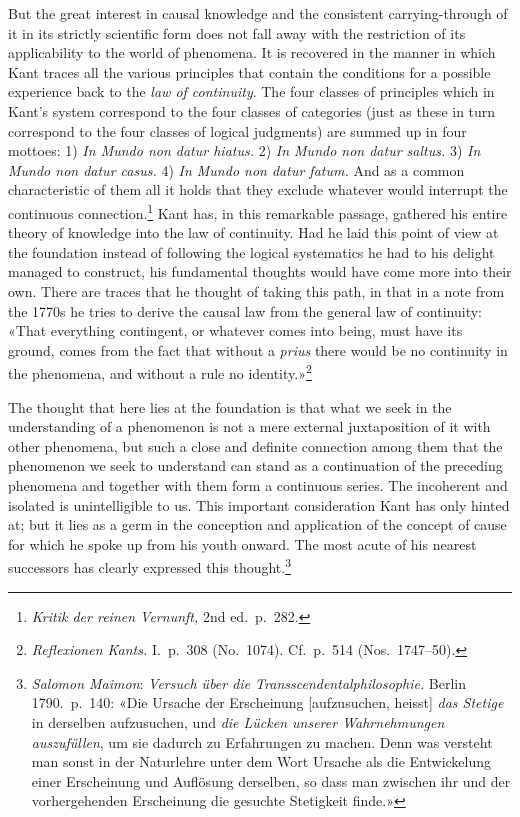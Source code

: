 \documentclass[12pt,a4paper]{article}
\begin{document}
But the great interest in causal knowledge and the consistent
carrying-through of it in its strictly scientific form does not fall away
with the restriction of its applicability to the world of phenomena. It is
recovered in the manner in which Kant traces all the various principles
that contain the conditions for a possible experience back to the \emph{law of
continuity}. The four classes of principles which in Kant's system
correspond to the four classes of categories (just as these in turn
correspond to the four classes of logical judgments) are summed up in four
mottoes: 1) \textit{In Mundo non datur hiatus.} 2) \textit{In Mundo non
datur saltus.} 3) \textit{In Mundo non datur casus.} 4) \textit{In Mundo
non datur fatum.} And as a common characteristic of them all it holds that
they exclude whatever would interrupt the continuous
connection.\footnote{\textit{Kritik der reinen Vernunft,} 2nd ed.\ p.\
282.} Kant has, in this remarkable passage, gathered his entire theory of
knowledge into the law of continuity. Had he laid this point of view at
the foundation instead of following the logical systematics he had to his
delight managed to construct, his fundamental thoughts would have come
more into their own. There are traces that he thought of taking this path,
in that in a note from the 1770s he tries to derive the causal law from
the general law of continuity: «That everything contingent, or whatever
comes into being, must have its ground, comes from the fact that without a
\textit{prius} there would be no continuity in the phenomena, and without a
rule no identity.»\footnote{\textit{Reflexionen Kants.} I.\ p.\ 308 (No.\
1074). Cf.\ p.\ 514 (Nos.\ 1747--50).}

The thought that here lies at the foundation is that what we seek in the
understanding of a phenomenon is not a mere external juxtaposition of it
with other phenomena, but such a close and definite connection among them
that the phenomenon we seek to understand can stand as a continuation of
the preceding phenomena and together with them form a continuous series.
The incoherent and isolated is unintelligible to us. This important
consideration Kant has only hinted at; but it lies as a germ in the
conception and application of the concept of cause for which he spoke up
from his youth onward. The most acute of his nearest successors has
clearly expressed this thought.\footnote{\emph{Salomon Maimon}: \textit{Versuch
über die Transscendentalphilosophie.} Berlin 1790.\ p.\ 140: «Die Ursache
der Erscheinung [aufzusuchen, heisst] \emph{das Stetige} in derselben
aufzusuchen, und \emph{die Lücken unserer Wahrnehmungen auszufüllen}, um sie
dadurch zu Erfahrungen zu machen. Denn was versteht man sonst in der
Naturlehre unter dem Wort Ursache als die Entwickelung einer Erscheinung
und Auflösung derselben, so dass man zwischen ihr und der vorhergehenden
Erscheinung die gesuchte Stetigkeit finde.»}
\end{document}
